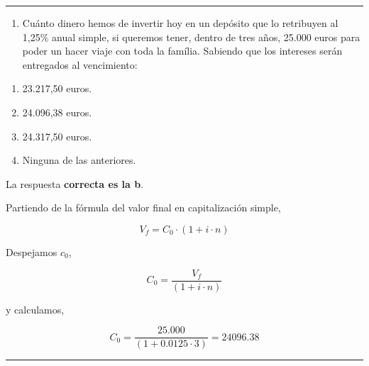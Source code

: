 \documentclass[
  letterpaper,
  DIV=11,
  numbers=noendperiod]{scrreprt}
\providecommand{\tightlist}{%
  \setlength{\itemsep}{0pt}\setlength{\parskip}{0pt}}\usepackage{longtable,booktabs,array}
\begin{document}
\begin{center}\rule{0.5\linewidth}{0.5pt}\end{center}

\begin{enumerate}
\def\labelenumi{\arabic{enumi}.}
\setcounter{enumi}{73}
\tightlist
\item
  Cuánto dinero hemos de invertir hoy en un depósito que lo retribuyen
  al 1,25\% anual simple, si queremos tener, dentro de tres años, 25.000
  euros para poder un hacer viaje con toda la família. Sabiendo que los
  intereses serán entregados al vencimiento:
\end{enumerate}

\begin{enumerate}
\def\labelenumi{\alph{enumi})}
\item
  23.217,50 euros.
\item
  24.096,38 euros.
\item
  24.317,50 euros.
\item
  Ninguna de las anteriores.
\end{enumerate}

\begin{tcolorbox}[enhanced jigsaw, left=2mm, opacityback=0, colback=white, breakable, arc=.35mm, bottomrule=.15mm, rightrule=.15mm, toprule=.15mm, leftrule=.75mm, colframe=quarto-callout-tip-color-frame]
\begin{minipage}[t]{5.5mm}
\textcolor{quarto-callout-tip-color}{\faLightbulb}
\end{minipage}%
\begin{minipage}[t]{\textwidth - 5.5mm}

La respuesta \textbf{correcta es la b}.

Partiendo de la fórmula del valor final en capitalización simple,

\[V_f=C_0\cdot\left(1+i\cdot n\right)\]

Despejamos \(c_0\),

\[C_0=\frac{V_f }{ \left(1+i\cdot n\right)}\]

y calculamos,

\[C_0=\frac{25.000}{\left(1+0.0125\cdot3\right)}=24096.38\]

\end{minipage}%
\end{tcolorbox}

\begin{center}\rule{0.5\linewidth}{0.5pt}\end{center}
\end{document}
